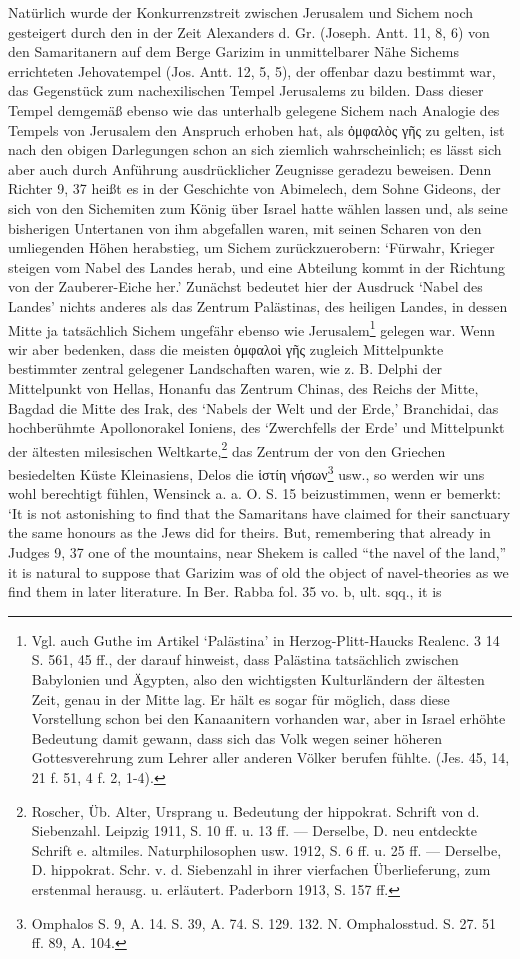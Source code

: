 \documentclass[a4paper, 11pt, oneside]{article}
\begin{document}
Natürlich wurde der Konkurrenzstreit zwischen Jerusalem und Sichem noch gesteigert durch den in der Zeit Alexanders d. Gr. (Joseph. Antt. 11, 8, 6) von den Samaritanern auf dem Berge Garizim in unmittelbarer Nähe Sichems errichteten Jehovatempel (Jos. Antt. 12, 5, 5), der offenbar dazu bestimmt war, das Gegenstück zum nachexilischen Tempel Jerusalems zu bilden. Dass dieser Tempel demgemäß ebenso wie das unterhalb gelegene Sichem nach Analogie des Tempels von Jerusalem den Anspruch erhoben hat, als ὀμφαλὸς γῆς zu gelten, ist nach den obigen Darlegungen schon an sich ziemlich wahrscheinlich; es lässt sich aber auch durch Anführung ausdrücklicher Zeugnisse geradezu beweisen. Denn Richter 9, 37 heißt es in der Geschichte von Abimelech, dem Sohne Gideons, der sich von den Sichemiten zum König über Israel hatte wählen lassen und, als seine bisherigen Untertanen von ihm abgefallen waren, mit seinen Scharen von den umliegenden Höhen herabstieg, um Sichem zurückzuerobern: `Fürwahr, Krieger steigen vom Nabel des Landes herab, und eine Abteilung kommt in der Richtung von der Zauberer-Eiche her.' Zunächst bedeutet hier der Ausdruck `Nabel des Landes' nichts anderes als das Zentrum Palästinas, des heiligen Landes, in dessen Mitte ja tatsächlich Sichem ungefähr ebenso wie Jerusalem\footnote{Vgl. auch Guthe im Artikel `Palästina' in Herzog-Plitt-Haucks Realenc. 3 14 S. 561, 45 ff., der darauf hinweist, dass Palästina tatsächlich zwischen Babylonien und Ägypten, also den wichtigsten Kulturländern der ältesten Zeit, genau in der Mitte lag. Er hält es sogar für möglich, dass diese Vorstellung schon bei den Kanaanitern vorhanden war, aber in Israel erhöhte Bedeutung damit gewann, dass sich das Volk wegen seiner höheren Gottesverehrung zum Lehrer aller anderen Völker berufen fühlte. (Jes. 45, 14, 21 f. 51, 4 f. 2, 1-4).} gelegen war. Wenn wir aber bedenken, dass die meisten ὀμφαλοὶ γῆς zugleich Mittelpunkte bestimmter zentral gelegener Landschaften waren, wie z. B. Delphi der Mittelpunkt von Hellas, Honanfu das Zentrum Chinas, des Reichs der Mitte, Bagdad die Mitte des Irak, des `Nabels der Welt und der Erde,' Branchidai, das hochberühmte Apollonorakel Ioniens, des `Zwerchfells der Erde' und Mittelpunkt der ältesten milesischen Weltkarte,\footnote{Roscher, Üb. Alter, Ursprang u. Bedeutung der hippokrat. Schrift von d. Siebenzahl. Leipzig 1911, S. 10 ff. u. 13 ff. --- Derselbe, D. neu entdeckte Schrift e. altmiles. Naturphilosophen usw. 1912, S. 6 ff. u. 25 ff. --- Derselbe, D. hippokrat. Schr. v. d. Siebenzahl in ihrer vierfachen Überlieferung, zum erstenmal herausg. u. erläutert. Paderborn 1913, S. 157 ff.} das Zentrum der von den Griechen besiedelten Küste Kleinasiens, Delos die ἱστίη νήσων\footnote{Omphalos S. 9, A. 14. S. 39, A. 74. S. 129. 132. N. Omphalosstud. S. 27. 51 ff. 89, A. 104.} usw., so werden wir uns wohl berechtigt fühlen, Wensinck a. a. O. S. 15 beizustimmen, wenn er bemerkt: `It is not astonishing to find that the Samaritans have claimed for their sanctuary the same honours as the Jews did for theirs. But, remembering that already in Judges 9, 37 one of the mountains, near Shekem is called "`the navel of the land,"' it is natural to suppose that Garizim was of old the object of navel-theories as we find them in later literature. In Ber. Rabba fol. 35 vo. b, ult. sqq., it is 
\end{document}
